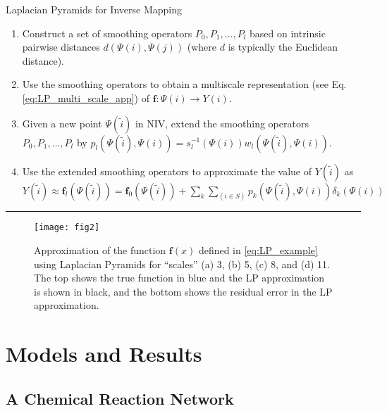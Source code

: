 \documentclass[aip,jcp,preprint]{revtex4-1}
\begin{document}
\begin{algorithm}[th!]
\caption{Laplacian Pyramids for Inverse Mapping}
\begin{enumerate}

\item
Construct a set of smoothing operators $P_0, P_1, \ldots, P_l$  based on intrinsic pairwise distances $d(\Psi(i),\Psi(j))$ (where $d$ is typically the Euclidean distance).

\item
Use the smoothing operators to obtain a multiscale representation (see Eq. \ref{eq:LP_multi_scale_app}) of $\mathbf{f}:\Psi(i) \rightarrow Y(i)$.

\item Given a new point $\Psi(\tilde{i})$ in NIV, extend the smoothing operators $P_0, P_1, \ldots, P_l$  by
$p_l(\Psi(\tilde{i}), \Psi(i)) = s_l^{-1}(\Psi(i)) w_l(\Psi(\tilde{i}),\Psi(i))$.

\item
Use the extended smoothing operators to approximate the value of $Y(\tilde{i})$ as $Y(\tilde{i}) \approx \mathbf{f}_l(\Psi(\tilde{i})) = \mathbf{f}_0(\Psi(\tilde{i})) + \sum_{k}\sum_{(i \in S)}p_k(\Psi(\tilde{i}), \Psi(i))\delta_k(\Psi(i))$


\end{enumerate}
\hrule
\label{algo_LP}
\end{algorithm}


\begin{figure*}[ht]
\texttt{[image: fig2]}
\caption{Approximation of the function $\mathbf{f}(x)$ defined in \eqref{eq:LP_example} using Laplacian Pyramids for ``scales'' (a) 3, (b) 5, (c) 8, and (d) 11. The top shows the true function in blue and the LP approximation is shown in black, and the bottom shows the residual error in the LP approximation.}
\label{fig:LP_ex}
\end{figure*}

\section{Models and Results} \label{sec:examples}

\subsection{A Chemical Reaction Network}\label{subsec:rxn_network}
\end{document}
